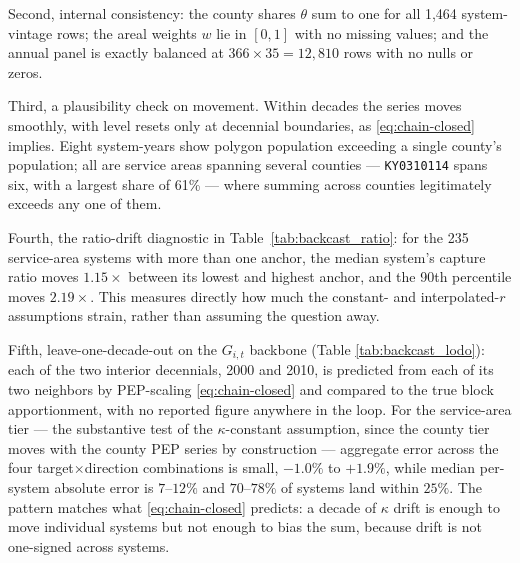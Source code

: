 Second, internal consistency: the county shares $\theta$ sum to one for all 1,464
system-vintage rows; the areal weights $w$ lie in $[0,1]$ with no missing values;
and the annual panel is exactly balanced at $366\times 35=12{,}810$ rows with no
nulls or zeros.

Third, a plausibility check on movement. Within decades the series moves
smoothly, with level resets only at decennial boundaries, as
\eqref{eq:chain-closed} implies. Eight system-years show polygon population
exceeding a single county's population; all are service areas spanning several
counties --- \texttt{KY0310114} spans six, with a largest share of 61\% --- where
summing across counties legitimately exceeds any one of them.

Fourth, the ratio-drift diagnostic in Table~\ref{tab:backcast_ratio}: for the 235
service-area systems with more than one anchor, the median system's capture ratio
moves $1.15\times$ between its lowest and highest anchor, and the 90th percentile
moves $2.19\times$. This measures directly how much the constant- and
interpolated-$r$ assumptions strain, rather than assuming the question away.

Fifth, leave-one-decade-out on the $G_{i,t}$ backbone (Table
\ref{tab:backcast_lodo}): each of the two interior decennials, 2000 and 2010, is
predicted from each of its two neighbors by PEP-scaling
\eqref{eq:chain-closed} and compared to the true block apportionment, with no
reported figure anywhere in the loop. For the service-area tier --- the
substantive test of the $\kappa$-constant assumption, since the county tier
moves with the county PEP series by construction --- aggregate error across the
four target$\times$direction combinations is small, $-1.0\%$ to $+1.9\%$, while
median per-system absolute error is $7$--$12\%$ and $70$--$78\%$ of systems land
within $25\%$. The pattern matches what \eqref{eq:chain-closed} predicts: a
decade of $\kappa$ drift is enough to move individual systems but not enough to
bias the sum, because drift is not one-signed across systems.



